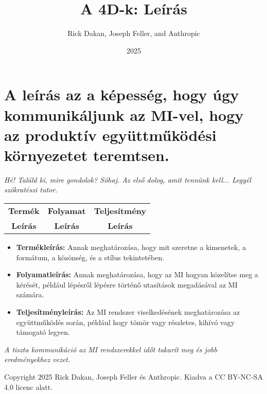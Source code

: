 \documentclass[a4paper, 12pt]{article}
\begin{document}
\title{A 4D-k: Leírás}
\author{Rick Dakan, Joseph Feller, and Anthropic}
\date{2025}
\maketitle

\section*{A leírás az a képesség, hogy úgy kommunikáljunk az MI-vel, hogy az produktív együttműködési környezetet teremtsen.}
\textit{Hé! Találd ki, mire gondolok? Sóhaj. Az első dolog, amit tennünk kell... Legyél szókratészi tutor.}

\begin{center}
\begin{tabular}{ccc}
\textbf{Termék} & \textbf{Folyamat} & \textbf{Teljesítmény} \\
\textbf{Leírás} & \textbf{Leírás} & \textbf{Leírás} \\
\end{tabular}
\end{center}

\begin{itemize}
    \item \textbf{Termékleírás:} Annak meghatározása, hogy mit szeretne a kimenetek, a formátum, a közönség, és a stílus tekintetében.
    \item \textbf{Folyamatleírás:} Annak meghatározása, hogy az MI hogyan közelítse meg a kérését, például lépésről lépésre történő utasítások megadásával az MI számára.
    \item \textbf{Teljesítményleírás:} Az MI rendszer viselkedésének meghatározása az együttműködés során, például hogy tömör vagy részletes, kihívó vagy támogató legyen.
\end{itemize}

\textit{A tiszta kommunikáció az MI rendszerekkel időt takarít meg és jobb eredményekhez vezet.}

\vspace{\fill}
\begin{center}
    \small{Copyright 2025 Rick Dakan, Joseph Feller és Anthropic. Kiadva a CC BY-NC-SA 4.0 licenc alatt.}
\end{center}
\end{document}
